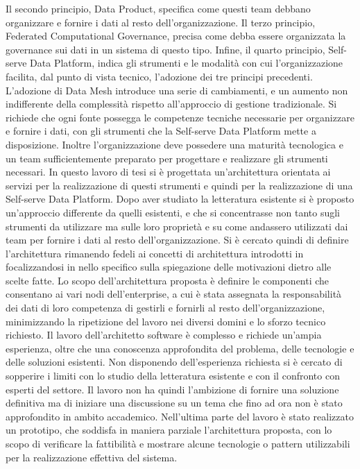 \documentclass[12pt]{report}
\begin{document}
Il secondo principio, Data Product, specifica come questi team debbano organizzare e fornire i dati al resto dell'organizzazione.
Il terzo principio, Federated Computational Governance, precisa come debba essere organizzata la governance sui dati in un sistema di questo tipo.
Infine, il quarto principio, Self-serve Data Platform, indica gli strumenti e le modalità con cui l'organizzazione facilita, dal punto di vista tecnico, l'adozione dei tre principi precedenti.
L'adozione di Data Mesh introduce una serie di cambiamenti, e un aumento non indifferente della complessità rispetto all'approccio di gestione tradizionale.
Si richiede che ogni fonte possegga le competenze tecniche necessarie per organizzare e fornire i dati, con gli strumenti che la Self-serve Data Platform mette a disposizione.
Inoltre l'organizzazione deve possedere una maturità tecnologica e un team sufficientemente preparato per progettare e realizzare gli strumenti necessari.
In questo lavoro di tesi si è progettata un'architettura orientata ai servizi per la realizzazione di questi strumenti e quindi per la realizzazione di una Self-serve Data Platform.
Dopo aver studiato la letteratura esistente si è proposto un'approccio differente da quelli esistenti, e che si concentrasse non tanto sugli strumenti da utilizzare ma sulle loro proprietà e su come andassero utilizzati dai team per fornire i dati al resto dell'organizzazione.
Si è cercato quindi di definire l'architettura rimanendo fedeli ai concetti di architettura introdotti in \cite{perry_foundations_1992} focalizzandosi in nello specifico sulla spiegazione delle motivazioni dietro alle scelte fatte.
Lo scopo dell'architettura proposta è definire le componenti che consentano ai vari nodi dell'enterprise, a cui è stata assegnata la responsabilità dei dati di loro competenza di gestirli e fornirli al resto dell'organizzazione, minimizzando la ripetizione del lavoro nei diversi domini e lo sforzo tecnico richiesto. 
Il lavoro dell'architetto software è complesso e richiede un'ampia esperienza, oltre che una conoscenza approfondita del problema, delle tecnologie e delle soluzioni esistenti.
Non disponendo dell'esperienza richiesta si è cercato di sopperire i limiti con lo studio della letteratura esistente e con il confronto con esperti del settore.
Il lavoro non ha quindi l'ambizione di fornire una soluzione definitiva ma di iniziare una discussione su un tema che fino ad ora non è stato approfondito in ambito accademico.
Nell'ultima parte del lavoro è stato realizzato un prototipo, che soddisfa in maniera parziale l'architettura proposta, con lo scopo di  verificare la fattibilità e mostrare alcune tecnologie o pattern utilizzabili per la realizzazione effettiva del sistema.
\end{document}
